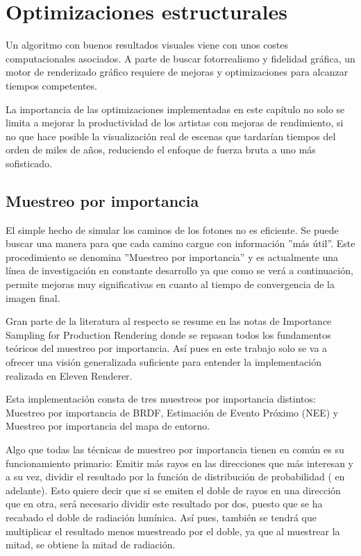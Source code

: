 ﻿\chapter{Optimizaciones estructurales}
	
Un algoritmo con buenos resultados visuales viene con unos costes computacionales asociados. A parte de buscar fotorrealismo y fidelidad gráfica, un motor de renderizado gráfico requiere de mejoras y optimizaciones para alcanzar tiempos competentes.

La importancia de las optimizaciones implementadas en este capítulo no solo se limita a mejorar la productividad de los artistas con mejoras de rendimiento, si no que hace posible la visualización real de escenas que tardarían tiempos del orden de miles de años, reduciendo el enfoque de fuerza bruta a uno más sofisticado.
	
\section{Muestreo por importancia}
\label{sec:mi}

El simple hecho de simular los caminos de los fotones no es eficiente. Se puede buscar una manera para que cada camino cargue con información ''más útil''. Este procedimiento se denomina ''Muestreo por importancia'' y es actualmente una línea de investigación en constante desarrollo ya que como se verá a continuación, permite mejoras muy significativas en cuanto al tiempo de convergencia de la imagen final.

Gran parte de la literatura al respecto se resume en las notas de Importance Sampling for Production Rendering\cite{colbert2010importance} donde se repasan todos los fundamentos teóricos del muestreo por importancia. Así pues en este trabajo solo se va a ofrecer una visión generalizada suficiente para entender la implementación realizada en Eleven Renderer.

Esta implementación consta de tres muestreos por importancia distintos: Muestreo por importancia de BRDF, Estimación de Evento Próximo (NEE) y Muestreo por importancia del mapa de entorno.

Algo que todas las técnicas de  muestreo por importancia tienen en común es su funcionamiento primario: Emitir más rayos en las direcciones que más interesan y a su vez, dividir el resultado por la función de distribución de probabilidad ( en adelante). Esto quiere decir que si se emiten el doble de rayos en una dirección que en otra, será necesario dividir este resultado por dos, puesto que se ha recabado el doble de radiación lumínica. Así pues, también se tendrá que multiplicar el resultado menos muestreado por el doble, ya que al muestrear la mitad, se obtiene la mitad de radiación.

